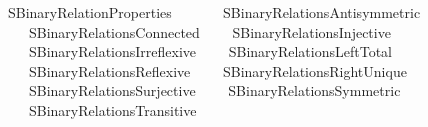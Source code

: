 %
\begin{isabellebody}%
%
%
\isadelimdocument
%
\endisadelimdocument
%
\isatagdocument
%
\isamarkuptrue%
%
\endisatagdocument
{\isafolddocument}%
%
\isadelimdocument
%
\endisadelimdocument
%
\isadelimtheory
%
\endisadelimtheory
%
\isatagtheory
{}\isamarkupfalse%
\ SBinary{\isacharunderscore}{\kern0pt}Relation{\isacharunderscore}{\kern0pt}Properties\isanewline
\ \ \isanewline
\ \ \ \ SBinary{\isacharunderscore}{\kern0pt}Relations{\isacharunderscore}{\kern0pt}Antisymmetric\isanewline
\ \ \ \ SBinary{\isacharunderscore}{\kern0pt}Relations{\isacharunderscore}{\kern0pt}Connected\isanewline
\ \ \ \ SBinary{\isacharunderscore}{\kern0pt}Relations{\isacharunderscore}{\kern0pt}Injective\isanewline
\ \ \ \ SBinary{\isacharunderscore}{\kern0pt}Relations{\isacharunderscore}{\kern0pt}Irreflexive\isanewline
\ \ \ \ SBinary{\isacharunderscore}{\kern0pt}Relations{\isacharunderscore}{\kern0pt}Left{\isacharunderscore}{\kern0pt}Total\isanewline
\ \ \ \ SBinary{\isacharunderscore}{\kern0pt}Relations{\isacharunderscore}{\kern0pt}Reflexive\isanewline
\ \ \ \ SBinary{\isacharunderscore}{\kern0pt}Relations{\isacharunderscore}{\kern0pt}Right{\isacharunderscore}{\kern0pt}Unique\isanewline
\ \ \ \ SBinary{\isacharunderscore}{\kern0pt}Relations{\isacharunderscore}{\kern0pt}Surjective\isanewline
\ \ \ \ SBinary{\isacharunderscore}{\kern0pt}Relations{\isacharunderscore}{\kern0pt}Symmetric\isanewline
\ \ \ \ SBinary{\isacharunderscore}{\kern0pt}Relations{\isacharunderscore}{\kern0pt}Transitive\isanewline
{}\isanewline
\isanewline
\isanewline
\isanewline
{}\isamarkupfalse%
%
\endisatagtheory
{\isafoldtheory}%
%
\isadelimtheory
%
\endisadelimtheory
%
\end{isabellebody}%
\endinput
